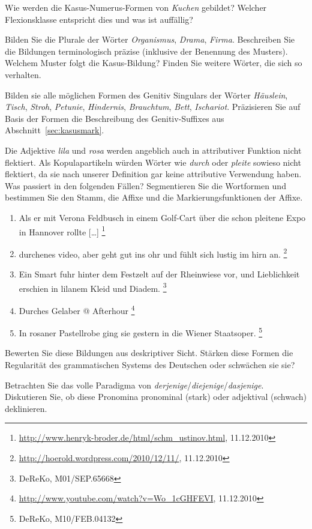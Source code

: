 \begin{sloppypar}
\Uebung \label{u82} Wie werden die Kasus-Numerus-Formen von \textit{Kuchen} gebildet?
Welcher Flexionsklasse entspricht dies und was ist auffällig?

\Uebung \label{u83} Bilden Sie die Plurale der Wörter \textit{Organismus}, \textit{Drama}, \textit{Firma}.
Beschreiben Sie die Bildungen terminologisch präzise (inklusive der Benennung des Musters).
Welchem Muster folgt die Kasus-Bildung?
Finden Sie weitere Wörter, die sich so verhalten.

\Uebung \label{u83a} Bilden sie alle möglichen Formen des Genitiv Singulars der Wörter \textit{Häuslein}, \textit{Tisch}, \textit{Stroh}, \textit{Petunie}, \textit{Hindernis}, \textit{Brauchtum}, \textit{Bett}, \textit{Ischariot}.
Präzisieren Sie auf Basis der Formen die Beschreibung des Genitiv-Suffixes aus Abschnitt~\ref{sec:kasusmark}.

\Uebung \label{u84} Die Adjektive \textit{lila} und \textit{rosa} werden angeblich auch in attributiver Funktion nicht flektiert.
Als Kopulapartikeln würden Wörter wie \textit{durch} oder \textit{pleite} sowieso nicht flektiert, da sie nach unserer Definition gar keine attributive Verwendung haben.
Was passiert in den folgenden Fällen?
Segmentieren Sie die Wortformen und bestimmen Sie den Stamm, die Affixe und die Markierungsfunktionen der Affixe.

\begin{enumerate}\Lf
  \item Als er mit Verona Feldbusch in einem Golf-Cart über die schon pleitene Expo in Hannover rollte [\ldots]%
  \footnote{\raggedright{\url{http://www.henryk-broder.de/html/schm_ustinov.html}, 11.12.2010}}
  \item durchenes video, aber geht gut ins ohr und fühlt sich lustig im hirn an.%
  \footnote{\raggedright{\url{http://hoerold.wordpress.com/2010/12/11/}, 11.12.2010}}
  \item Ein Smart fuhr hinter dem Festzelt auf der Rheinwiese vor, und Lieblichkeit erschien in lilanem Kleid und Diadem.%
  \footnote{\raggedright{DeReKo, M01\slash SEP.65668}}
  \item Durches Gelaber @ Afterhour%
  \footnote{\raggedright{\url{http://www.youtube.com/watch?v=Wo_1cGHFEVI}, 11.12.2010}}
  \item In rosaner Pastellrobe ging sie gestern in die Wiener Staatsoper.%
  \footnote{\raggedright{DeReKo, M10\slash FEB.04132}}
\end{enumerate}

Bewerten Sie diese Bildungen aus deskriptiver Sicht.
Stärken diese Formen die Regularität des grammatischen Systems des Deutschen oder schwächen sie sie?

\Uebung[\tristar] \label{u85} Betrachten Sie das volle Paradigma von \textit{derjenige}\slash \textit{diejenige}\slash \textit{dasjenige}.
Diskutieren Sie, ob diese Pronomina pronominal (stark) oder adjektival (schwach) deklinieren.

\end{sloppypar}
